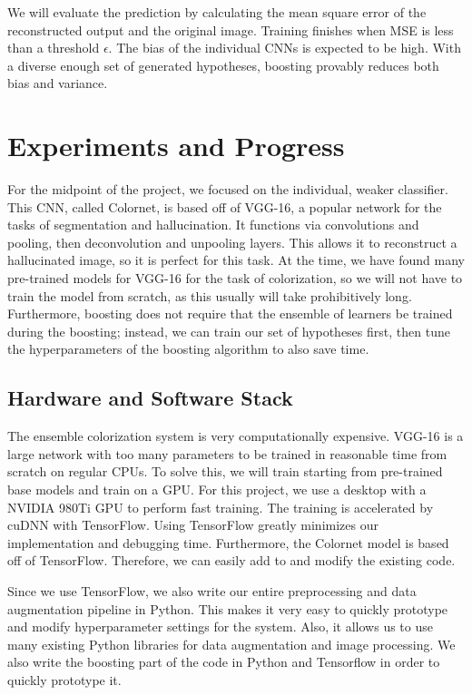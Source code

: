 \documentclass[10pt,twocolumn,letterpaper]{article}
\begin{document}
We will evaluate the prediction by calculating the mean square error of the reconstructed output and the original image. Training finishes when MSE is less than a threshold $\epsilon$. The bias of the individual CNNs is expected to be high. With a diverse enough set of generated hypotheses, boosting provably reduces both bias and variance.

\section{Experiments and Progress}

For the midpoint of the project, we focused on the individual, weaker classifier. This CNN, called Colornet, is based off of VGG-16, a popular network for the tasks of segmentation and hallucination. It functions via convolutions and pooling, then deconvolution and unpooling layers. This allows it to reconstruct a hallucinated image, so it is perfect for this task. At the time, we have found many pre-trained models for VGG-16 for the task of colorization, so we will not have to train the model from scratch, as this usually will take prohibitively long. Furthermore, boosting does not require that the ensemble of learners be trained during the boosting; instead, we can train our set of hypotheses first, then tune the hyperparameters of the boosting algorithm to also save time.

\subsection{Hardware and Software Stack}
The ensemble colorization system is very computationally expensive. VGG-16 is a large network with too many parameters to be trained in reasonable time from scratch on regular CPUs. To solve this, we will train starting from pre-trained base models and train on a GPU. For this project, we use a desktop with a NVIDIA 980Ti GPU to perform fast training. The training is accelerated by cuDNN with TensorFlow. Using TensorFlow greatly minimizes our implementation and debugging time. Furthermore, the Colornet model is based off of TensorFlow. Therefore, we can easily add to and modify the existing code.

Since we use TensorFlow, we also write our entire preprocessing and data augmentation pipeline in Python. This makes it very easy to quickly prototype and modify hyperparameter settings for the system. Also, it allows us to use many existing Python libraries for data augmentation and image processing. We also write the boosting part of the code in Python and Tensorflow in order to quickly prototype it.
\end{document}
